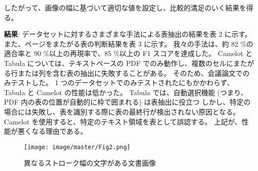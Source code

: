 \documentclass[uplatex, twocolumn,10pt]{jsarticle}
\begin{document}
したがって、画像の幅に基づいて適切な値を設定し、比較的満足のいく結果を得る。

\textbf{結果}:
データセットに対するさまざまな手法による表抽出の結果を表 2 に示す。
また、ページをまたがる表の判断結果を表 3 に示す。
我々の手法は、約 82 \%の適合率と 90 \%以上の再現率で、85 \%以上の F1 スコアを達成した。
Camelot と Tabula については、テキストベースの PDF でのみ動作し、複数のセルにまたがる行または列を含む表の抽出に失敗することがある。
そのため、会議論文でのみテストした。
1 つのデータセットでのみテストされたにもかかわらず、Tabula と Camelot の性能は低かった。
Tabula では、自動選択機能 (つまり、PDF 内の表の位置が自動的に枠で囲まれる) は表抽出に役立つ
しかし、特定の場合には失敗し、表を識別する際に表の最終行が検出されない原因となる。
Camelot を使用すると、特定のテキスト領域を表として誤認する。
上記が、性能が悪くなる理由である。








\begin{figure}[tp]
    \begin{center}
        \texttt{[image: image/master/Fig2.png]}
        \caption{異なるストローク幅の文字がある文書画像}
        \label{fig2}
    \end{center}
\end{figure}
\end{document}
